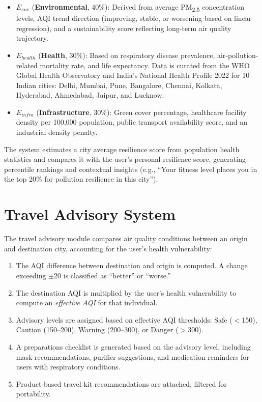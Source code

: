 \documentclass[12pt,a4paper]{report}
\begin{document}
\begin{itemize}[leftmargin=*]
  \item $E_{env}$ (\textbf{Environmental}, 40\%): Derived from average PM\textsubscript{2.5} concentration levels, AQI trend direction (improving, stable, or worsening based on linear regression), and a sustainability score reflecting long-term air quality trajectory.

  \item $E_{health}$ (\textbf{Health}, 30\%): Based on respiratory disease prevalence, air-pollution-related mortality rate, and life expectancy. Data is curated from the WHO Global Health Observatory and India's National Health Profile 2022 for 10 Indian cities: Delhi, Mumbai, Pune, Bangalore, Chennai, Kolkata, Hyderabad, Ahmedabad, Jaipur, and Lucknow.

  \item $E_{infra}$ (\textbf{Infrastructure}, 30\%): Green cover percentage, healthcare facility density per 100,000 population, public transport availability score, and an industrial density penalty.
\end{itemize}

The system estimates a city average resilience score from population health statistics and compares it with the user's personal resilience score, generating percentile rankings and contextual insights (e.g., ``Your fitness level places you in the top 20\% for pollution resilience in this city'').

\section{Travel Advisory System}

The travel advisory module compares air quality conditions between an origin and destination city, accounting for the user's health vulnerability:

\begin{enumerate}[leftmargin=*]
  \item The AQI difference between destination and origin is computed. A change exceeding $\pm$20 is classified as ``better'' or ``worse.''
  \item The destination AQI is multiplied by the user's health vulnerability to compute an \textit{effective AQI} for that individual.
  \item Advisory levels are assigned based on effective AQI thresholds: Safe ($<$150), Caution (150--200), Warning (200--300), or Danger ($>$300).
  \item A preparations checklist is generated based on the advisory level, including mask recommendations, purifier suggestions, and medication reminders for users with respiratory conditions.
  \item Product-based travel kit recommendations are attached, filtered for portability.
\end{enumerate}
\end{document}
